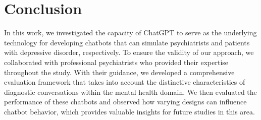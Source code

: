 \section{Conclusion}
\label{sec:conclusion}
In this work, we investigated the capacity of ChatGPT to serve as the underlying technology for developing chatbots that can simulate psychiatrists and patients with depressive disorder, respectively. To ensure the validity of our approach, we collaborated with professional psychiatrists who provided their expertise throughout the study. With their guidance, we developed a comprehensive evaluation framework that takes into account the distinctive characteristics of diagnostic conversations within the mental health domain. We then evaluated the performance of these chatbots and observed how varying designs can influence chatbot behavior, which provides valuable insights for future studies in this area.



